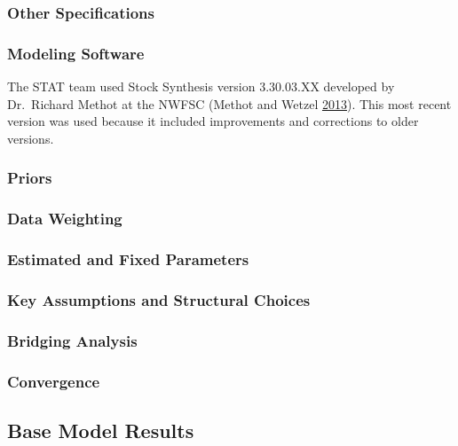 \documentclass[12pt,]{article}
\begin{document}
\subsubsection{Other Specifications}\label{other-specifications}

\subsubsection{Modeling Software}\label{modeling-software}

The STAT team used Stock Synthesis version 3.30.03.XX developed by
Dr.~Richard Methot at the NWFSC (Methot and Wetzel
\protect\hyperlink{ref-methot_stock_2013}{2013}). This most recent
version was used because it included improvements and corrections to
older versions.

\subsubsection{Priors}\label{priors}

\subsubsection{Data Weighting}\label{data-weighting}

\subsubsection{Estimated and Fixed
Parameters}\label{estimated-and-fixed-parameters}

\subsubsection{Key Assumptions and Structural
Choices}\label{key-assumptions-and-structural-choices}

\subsubsection{Bridging Analysis}\label{bridging-analysis}

\subsubsection{Convergence}\label{convergence}

\subsection{Base Model Results}\label{base-model-results}
\end{document}
